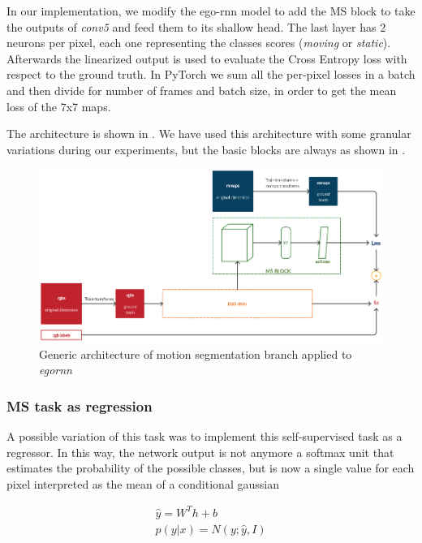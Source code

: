 \documentclass[10pt,twocolumn,hidelinks,letterpaper]{article}
\begin{document}
In our implementation, we modify the ego-rnn model to add the MS block to take the outputs of \textit{conv5} and feed them to its shallow head. The last layer
has 2 neurons per pixel, each one representing the classes scores (\textit{moving} or \textit{static}). Afterwards the linearized output is used to evaluate the Cross Entropy loss with respect to the ground truth. In PyTorch we sum all the per-pixel losses in a batch and then divide for number of frames and batch size, in order to get the mean loss of the 7x7 maps.

The architecture is shown in . We have used this architecture with some granular variations during our experiments, but the basic blocks are always as shown in .

\begin{figure}
  \centering
  \includegraphics[width=\linewidth]{images/egornn+msblock_architecture.png}
  \caption{Generic architecture of motion segmentation branch applied to \textit{egornn}}
  \label{msblock_arch}
\end{figure}

\subsubsection{MS task as regression}

A possible variation of this task was to implement this self-supervised task as a regressor. In this way, the network output is not anymore a softmax unit that estimates the probability of the possible classes, but is now a single value for each pixel interpreted as the mean of a conditional gaussian 

\begin{align*}
\hat{y} = W^Th + b\\
p(y|x) = N(y; \hat{y},I)\\
\end{align*}
\end{document}
